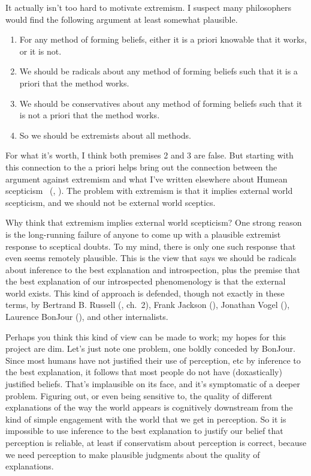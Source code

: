 \documentclass[
  10pt,
  letterpaper,
  twoside]{scrbook}
\providecommand{\tightlist}{%
  \setlength{\itemsep}{0pt}\setlength{\parskip}{0pt}}\usepackage{longtable,booktabs,array}
\begin{document}
It actually isn't too hard to motivate extremism. I suspect many
philosophers would find the following argument at least somewhat
plausible.

\begin{enumerate}
\def\labelenumi{\arabic{enumi}.}
\tightlist
\item
  For any method of forming beliefs, either it is a priori knowable that
  it works, or it is not.
\item
  We should be radicals about any method of forming beliefs such that it
  is a priori that the method works.
\item
  We should be conservatives about any method of forming beliefs such
  that it is not a priori that the method works.
\item
  So we should be extremists about all methods.
\end{enumerate}

For what it's worth, I think both premises 2 and 3 are false. But
starting with this connection to the a priori helps bring out the
connection between the argument against extremism and what I've written
elsewhere about Humean scepticism
~(,
). The problem with
extremism is that it implies external world scepticism, and we should
not be external world sceptics.

Why think that extremism implies external world scepticism? One strong
reason is the long-running failure of anyone to come up with a plausible
extremist response to sceptical doubts. To my mind, there is only one
such response that even seems remotely plausible. This is the view that
says we should be radicals about inference to the best explanation and
introspection, plus the premise that the best explanation of our
introspected phenomenology is that the external world exists. This kind
of approach is defended, though not exactly in these terms, by Bertrand
B. Russell (, ch.~2), {Frank}
Jackson (), Jonathan Vogel
(), Laurence BonJour
(), and other internalists.

Perhaps you think this kind of view can be made to work; my hopes for
this project are dim. Let's just note one problem, one boldly conceded
by BonJour. Since most humans have not justified their use of
perception, etc by inference to the best explanation, it follows that
most people do not have (doxastically) justified beliefs. That's
implausible on its face, and it's symptomatic of a deeper problem.
Figuring out, or even being sensitive to, the quality of different
explanations of the way the world appears is cognitively downstream from
the kind of simple engagement with the world that we get in perception.
So it is impossible to use inference to the best explanation to justify
our belief that perception is reliable, at least if conservatism about
perception is correct, because we need perception to make plausible
judgments about the quality of explanations.
\end{document}
